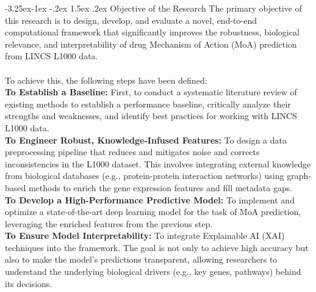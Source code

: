 \documentclass[12pt,a4paper]{article}
\makeatletter
\renewcommand\subsection{\@startsection{subsection}{2}{\z@}%
  {-3.25ex\@plus-1ex \@minus-.2ex}%
  {1.5ex \@plus.2ex}%
  {\normalfont\normalsize\bfseries}}
\makeatother
\begin{document}
\subsection{Objective of the Research}
The primary objective of this research is to design, develop, and evaluate a novel, end-to-end computational framework that significantly improves the robustness, biological relevance, and interpretability of drug Mechanism of Action (MoA) prediction from LINCS L1000 data.
\\ \\
To achieve this, the following steps have been defined:
\\
\textbf{To Establish a Baseline:} First, to conduct a systematic literature review of existing methods to establish a performance baseline, critically analyze their strengths and weaknesses, and identify best practices for working with LINCS L1000 data.
\\
\textbf{To Engineer Robust, Knowledge-Infused Features:} To design a data preprocessing pipeline that reduces and mitigates noise and corrects inconsistencies in the L1000 dataset. This involves integrating external knowledge from biological databases (e.g., protein-protein interaction networks) using graph-based methods to enrich the gene expression features and fill metadata gaps.
\\
\textbf{To Develop a High-Performance Predictive Model:} To implement and optimize a state-of-the-art deep learning model for the task of MoA prediction, leveraging the enriched features from the previous step.
\\
\textbf{To Ensure Model Interpretability:} To integrate Explainable AI (XAI) techniques into the framework. The goal is not only to achieve high accuracy but also to make the model’s predictions transparent, allowing researchers to understand the underlying biological drivers (e.g., key genes, pathways) behind its decisions.
\end{document}

